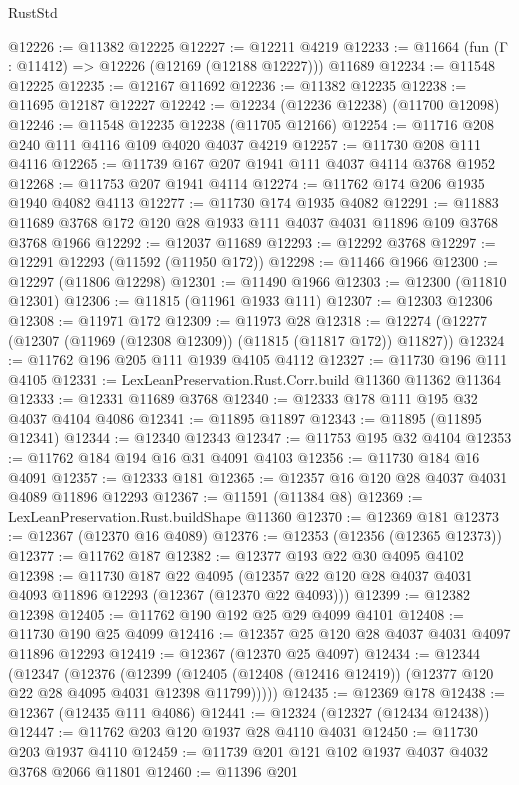 \begin{lexlean}{RustStd}
\begin{coremodule}
@12226 := @11382 @12225
@12227 := @12211 @4219
@12233 := @11664 (fun (Γ : @11412) => @12226 (@12169 (@12188 @12227))) @11689
@12234 := @11548 @12225
@12235 := @12167 @11692
@12236 := @11382 @12235
@12238 := @11695 @12187 @12227
@12242 := @12234 (@12236 @12238) (@11700 @12098)
@12246 := @11548 @12235 @12238 (@11705 @12166)
@12254 := @11716 @208 @240 @111 @4116 @109 @4020 @4037 @4219
@12257 := @11730 @208 @111 @4116
@12265 := @11739 @167 @207 @1941 @111 @4037 @4114 @3768 @1952
@12268 := @11753 @207 @1941 @4114
@12274 := @11762 @174 @206 @1935 @1940 @4082 @4113
@12277 := @11730 @174 @1935 @4082
@12291 := @11883 @11689 @3768 @172 @120 @28 @1933 @111 @4037 @4031 @11896 @109 @3768 @3768 @1966
@12292 := @12037 @11689
@12293 := @12292 @3768
@12297 := @12291 @12293 (@11592 (@11950 @172))
@12298 := @11466 @1966
@12300 := @12297 (@11806 @12298)
@12301 := @11490 @1966
@12303 := @12300 (@11810 @12301)
@12306 := @11815 (@11961 @1933 @111)
@12307 := @12303 @12306
@12308 := @11971 @172
@12309 := @11973 @28
@12318 := @12274 (@12277 (@12307 (@11969 (@12308 @12309)) (@11815 (@11817 @172)) @11827))
@12324 := @11762 @196 @205 @111 @1939 @4105 @4112
@12327 := @11730 @196 @111 @4105
@12331 := LexLeanPreservation.Rust.Corr.build @11360 @11362 @11364
@12333 := @12331 @11689 @3768
@12340 := @12333 @178 @111 @195 @32 @4037 @4104 @4086
@12341 := @11895 @11897
@12343 := @11895 (@11895 @12341)
@12344 := @12340 @12343
@12347 := @11753 @195 @32 @4104
@12353 := @11762 @184 @194 @16 @31 @4091 @4103
@12356 := @11730 @184 @16 @4091
@12357 := @12333 @181
@12365 := @12357 @16 @120 @28 @4037 @4031 @4089 @11896 @12293
@12367 := @11591 (@11384 @8)
@12369 := LexLeanPreservation.Rust.buildShape @11360
@12370 := @12369 @181
@12373 := @12367 (@12370 @16 @4089)
@12376 := @12353 (@12356 (@12365 @12373))
@12377 := @11762 @187
@12382 := @12377 @193 @22 @30 @4095 @4102
@12398 := @11730
    @187
    @22
    @4095
    (@12357 @22 @120 @28 @4037 @4031 @4093 @11896 @12293 (@12367 (@12370 @22 @4093)))
@12399 := @12382 @12398
@12405 := @11762 @190 @192 @25 @29 @4099 @4101
@12408 := @11730 @190 @25 @4099
@12416 := @12357 @25 @120 @28 @4037 @4031 @4097 @11896 @12293
@12419 := @12367 (@12370 @25 @4097)
@12434 := @12344
    (@12347
      (@12376
        (@12399 (@12405 (@12408 (@12416 @12419)) (@12377 @120 @22 @28 @4095 @4031 @12398 @11799)))))
@12435 := @12369 @178
@12438 := @12367 (@12435 @111 @4086)
@12441 := @12324 (@12327 (@12434 @12438))
@12447 := @11762 @203 @120 @1937 @28 @4110 @4031
@12450 := @11730 @203 @1937 @4110
@12459 := @11739 @201 @121 @102 @1937 @4037 @4032 @3768 @2066 @11801
@12460 := @11396 @201

\end{coremodule}
\end{lexlean}
